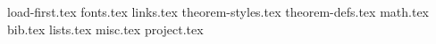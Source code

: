 

{load-first.tex}
{fonts.tex}
{links.tex}
{theorem-styles.tex}
{theorem-defs.tex}
{math.tex}
{bib.tex}
{lists.tex}
{misc.tex}
{project.tex}
